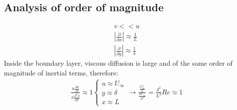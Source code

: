 \subsection{Analysis of order of magnitude}
\begin{align}
  v << u                                                         \\
  \left| \frac{\partial}{\partial x} \right| \approx \frac{1}{L} \\
  \left| \frac{\partial}{\partial y} \right| \approx \frac{1}{\delta}
\end{align}
Inside the boundary layer, viscous diffusion is large and of the same order of magnitude of inertial terms, therefore:
\begin{align}
  \frac{u\frac{\partial u}{\partial x}}{\nu\frac{\partial^2 u}{\partial y^2}} \approx 1 \begin{cases}
    u\approx U_\infty \\
    y \approx \delta  \\
    x \approx L
  \end{cases} \rightarrow \frac{\frac{U_\infty^2}{L}}{\frac{\nu U_\infty}{\delta^2}} = \frac{\delta^2}{L^2} Re \approx 1
\end{align}
